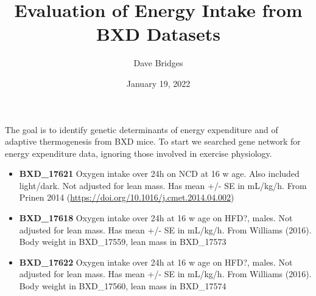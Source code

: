 \documentclass[]{article}
\title{Evaluation of Energy Intake from BXD Datasets}
\author{Dave Bridges}
\date{January 19, 2022}
\providecommand{\tightlist}{%
  \setlength{\itemsep}{0pt}\setlength{\parskip}{0pt}}
\begin{document}
\maketitle

{
\setcounter{tocdepth}{2}
\tableofcontents
}
The goal is to identify genetic determinants of energy expenditure and
of adaptive thermogenesis from BXD mice. To start we searched gene
network for energy expenditure data, ignoring those involved in exercise
physiology.

\begin{itemize}
\tightlist
\item
  \textbf{BXD\_17621} Oxygen intake over 24h on NCD at 16 w age. Also
  included light/dark. Not adjusted for lean mass. Has mean +/- SE in
  mL/kg/h. From Prinen 2014
  (\url{https://doi.org/10.1016/j.cmet.2014.04.002})
\item
  \textbf{BXD\_17618} Oxygen intake over 24h at 16 w age on HFD?, males.
  Not adjusted for lean mass. Has mean +/- SE in mL/kg/h. From Williams
  (2016). Body weight in BXD\_17559, lean mass in BXD\_17573
\item
  \textbf{BXD\_17622} Oxygen intake over 24h at 16 w age on HFD?, males.
  Not adjusted for lean mass. Has mean +/- SE in mL/kg/h. From Williams
  (2016). Body weight in BXD\_17560, lean mass in BXD\_17574
\end{itemize}
\end{document}
